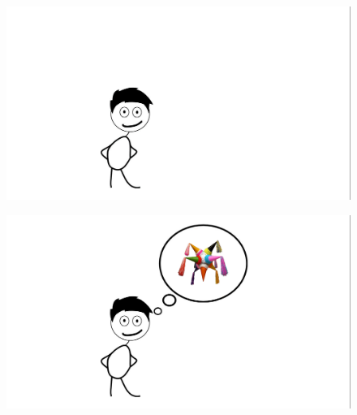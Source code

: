 \begin{frame}
\begin{figure}

\vspace{-.7cm}	
\hspace{-2cm}		\includegraphics[width=1.2\linewidth]{Pictures/animations/animation_A.png}
		\end{figure}

\end{frame}

\begin{frame}
\begin{figure}

\vspace{-.7cm}	
\hspace{-2cm}		\includegraphics[width=1.2\linewidth]{Pictures/animations/animation_B.png}
		\end{figure}

\end{frame}



